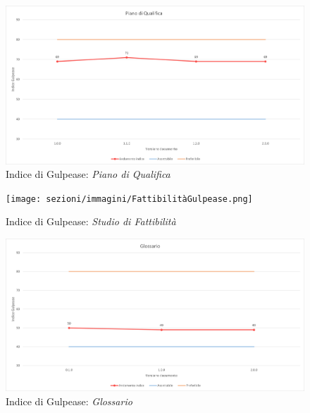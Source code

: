 \begin{figure}[!ht]
    \caption{Indice di Gulpease: \textit{Piano di Qualifica}}
    \vspace{10px}
    \includegraphics[scale=0.5]{sezioni/immagini/PianoQualificaGulpease.png}
    \centering
\end{figure}
\pagebreak
\begin{figure}[!ht]
    \caption{Indice di Gulpease: \textit{Studio di Fattibilità}}
    \vspace{10px}
    \texttt{[image: sezioni/immagini/FattibilitàGulpease.png]}
    \centering
\end{figure}
\pagebreak
\begin{figure}[!ht]
    \caption{Indice di Gulpease: \textit{Glossario}}
    \vspace{10px}
    \includegraphics[scale=0.5]{sezioni/immagini/GlossarioGulpease.png}
    \centering
\end{figure}

